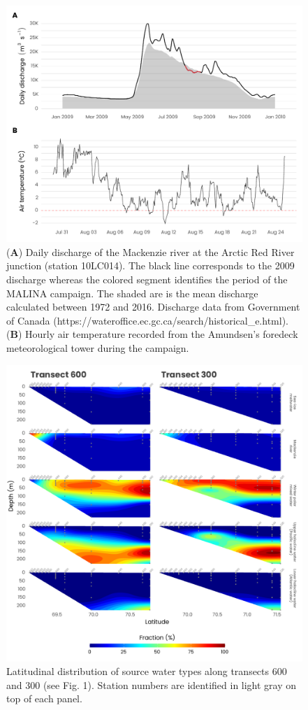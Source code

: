 \documentclass[essd, manuscript]{copernicus}
\begin{document}
\begin{figure}[H]
	\centering
	\includegraphics[scale = 1]{../../../graphs/fig02.pdf}
	\caption{(\textbf{A}) Daily discharge of the Mackenzie river at the Arctic Red River junction (station 10LC014). The black line corresponds to the 2009 discharge whereas the colored segment identifies the period of the MALINA campaign. The shaded are is the mean discharge calculated between 1972 and 2016. Discharge data from Government of Canada (https://wateroffice.ec.gc.ca/search/historical\_e.html). (\textbf{B}) Hourly air temperature recorded from the Amundsen's foredeck meteorological tower during the campaign.}
\end{figure}

\clearpage

\begin{figure}[H]
	\centering
	\includegraphics[scale = 1]{../../../graphs/fig03.pdf}
	\caption{Latitudinal distribution of source water types along transects 600 and 300 (see Fig. 1). Station numbers are identified in light gray on top of each panel.}
\end{figure}
\end{document}
